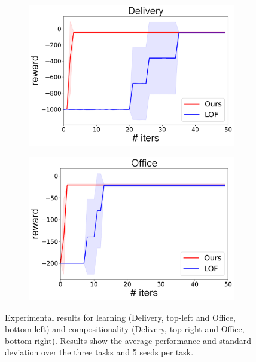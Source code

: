 \begin{figure}[htb]
\begin{subfigure}[b]{0.5\textwidth}
    \centering
    \includegraphics[scale=0.28]{figures/chapter3/results/readapt_delivery.pdf}  
  \end{subfigure}
  \hfill
   \begin{subfigure}[b]{0.5\textwidth}
    \centering
    \includegraphics[scale=0.28]{figures/chapter3/results/readapt_office.pdf}  
  \end{subfigure}
  \caption{Experimental results for learning (Delivery, top-left and Office, bottom-left) and compositionality (Delivery, top-right and Office, bottom-right). Results show the average performance and standard deviation over the three tasks and 5 seeds per task.}
  \label{fig:exp_results}
\end{figure}
